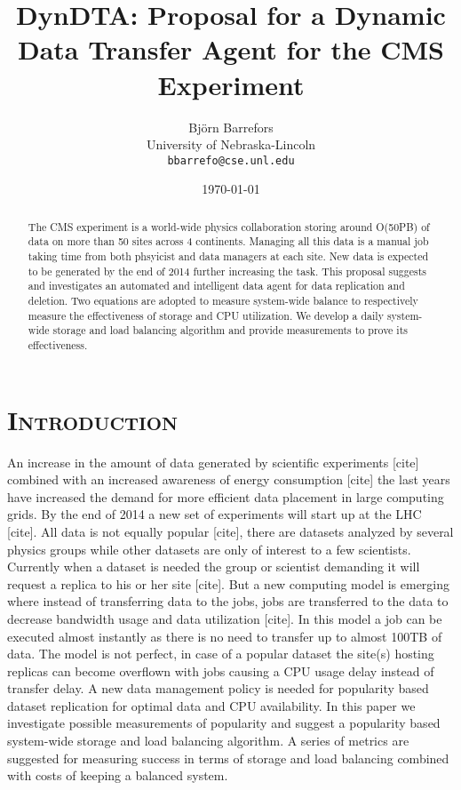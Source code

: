 \documentclass[11pt,a4page]{article}
\title{\textbf{\fontfamily{\sfdefault}\selectfont DynDTA: Proposal for a Dynamic Data Transfer Agent for the CMS Experiment}}
\author{Bj\"{o}rn Barrefors\\
  University of Nebraska-Lincoln\\
  \texttt{bbarrefo@cse.unl.edu}}
\date{\today}
\begin{document}
\maketitle

\begin{abstract}

	The CMS experiment is a world-wide physics collaboration storing around O(50PB) of data on more than 50 sites across 4 continents. Managing all this data is a manual job taking time from both phsyicist and data managers at each site. New data is expected to be generated by the end of 2014 further increasing the task. This proposal suggests and investigates an automated and intelligent data agent for data replication and deletion. Two equations are adopted to measure system-wide balance to respectively measure the effectiveness of storage and CPU utilization. We develop a daily system-wide storage and load balancing algorithm and provide measurements to prove its effectiveness.

\end{abstract}


\section{\textsc{Introduction}}

  An increase in the amount of data generated by scientific experiments [cite] combined with an increased awareness of energy consumption [cite] the last years have increased the demand for more efficient data placement in large computing grids. By the end of 2014 a new set of experiments will start up at the LHC [cite]. All data is not equally popular [cite], there are datasets analyzed by several physics groups while other datasets are only of interest to a few scientists. Currently when a dataset is needed the group or scientist demanding it will request a replica to his or her site [cite]. But a new computing model is emerging where instead of transferring data to the jobs, jobs are transferred to the data to decrease bandwidth usage and data utilization [cite]. In this model a job can be executed almost instantly as there is no need to transfer up to almost 100TB of data. The model is not perfect, in case of a popular dataset the site(s) hosting replicas can become overflown with jobs causing a CPU usage delay instead of transfer delay. A new data management policy is needed for popularity based dataset replication for optimal data and CPU availability.
  In this paper we investigate possible measurements of popularity and suggest a popularity based system-wide storage and load balancing algorithm. A series of metrics are suggested for measuring success in terms of storage and load balancing combined with costs of keeping a balanced system.
\end{document}

